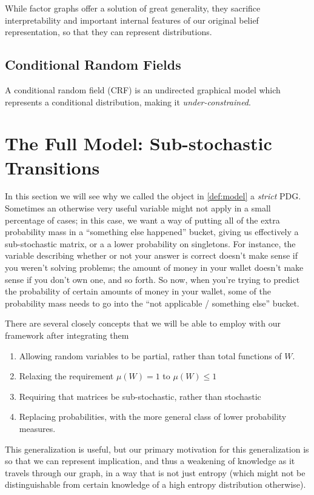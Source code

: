 \documentclass{article}
\newcommand{\MN}{PDG}%
\begin{document}
	While factor graphs offer a solution of great generality, they sacrifice interpretability and important internal features of our original belief representation, so that they can represent distributions.
	
	
	\subsection{Conditional Random Fields}
	A conditional random field (CRF) is an undirected graphical model which represents a conditional distribution, making it \emph{under-constrained}.	
		

	\section{The Full Model: Sub-stochastic Transitions} \label{sec:full-model}
	
	In this section we will see why we called the object in \cref{def:model} a \textit{strict} \MN.	
	Sometimes an otherwise very useful variable might not apply in a small percentage of cases; in this case, we want a way of putting all of the extra probability mass in a ``something else happened'' bucket, giving us effectively a sub-stochastic matrix, or a a lower probability on singletons. For instance, the variable describing whether or not your answer is correct doesn't make sense if you weren't solving problems; the amount of money in your wallet doesn't make sense if you don't own one, and so forth. So now, when you're trying to predict the probability of certain amounts of money in your wallet, some of the probability mass needs to go into the ``not applicable / something else'' bucket. 
	
	There are several closely concepts that we will be able to employ with our framework after integrating them
	\begin{enumerate}[nosep]
		\item Allowing random variables to be partial, rather than total functions of $W$. 
		\item Relaxing the requirement $\mu(W) = 1$ to $\mu(W) \leq 1$
		\item Requiring that matrices be sub-stochastic, rather than stochastic
		\item Replacing probabilities, with the more general class of lower probability measures.
	\end{enumerate}

	This generalization is useful, but our primary motivation for this generalization is so that we can represent implication, and thus a weakening of knowledge as it travels through our graph, in a way that is not just entropy (which might not be distinguishable from certain knowledge of a high entropy distribution otherwise). 
\end{document}
